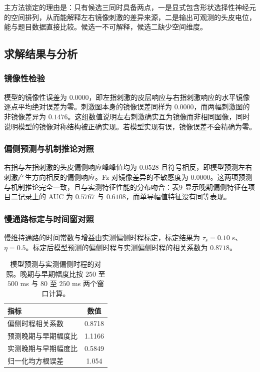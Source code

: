 \documentclass[bwprint]{gmcmthesis}
\begin{document}
主方法锁定的理由是：只有候选三同时具备两点，一是显式包含形状选择性神经元的空间排列，从而能解释左右镜像刺激的差异来源，二是输出可观测的头皮电位，能与题目数据直接比较。候选一不可解释，候选二缺少空间维度。

\subsection{求解结果与分析}

\subsubsection{镜像性检验}

模型的镜像性误差为 $0.0000$，即左指刺激的皮层响应与右指刺激响应的水平镜像逐点平均绝对误差为零。刺激图本身的镜像误差同样为 $0.0000$，而两幅刺激图的非镜像差异为 $0.1476$。这组数值说明左右刺激确实互为镜像而非相同图像，同时说明模型的镜像对称结构被正确实现。若模型实现有误，镜像误差不会精确为零。

\subsubsection{偏侧预测与机制推论对照}

右指与左指刺激的头皮偏侧响应峰峰值均为 $0.0528$ 且符号相反，即模型预测左右刺激产生方向相反的偏侧响应。Fz 对镜像差异的不敏感度为 $0.0000$。这两项预测与机制推论完全一致，且与实测特征性能的分布吻合：表9 显示晚期偏侧特征在项目二记录上的 AUC 为 $0.5767$ 与 $0.6108$，而单导幅值特征没有同等表现。

\subsubsection{慢通路标定与时间窗对照}

慢维持通路的时间常数与增益由实测偏侧时程标定，标定结果为 $\tau_s = 0.10$ s、$\eta = 0.5$。标定后模型预测的偏侧时程与实测偏侧时程的相关系数为 $0.8718$。

\begin{table}[htp!]
\centering
\renewcommand\arraystretch{1.2}
\caption{模型预测与实测偏侧时程的对照。晚期与早期幅度比按 $250$ 至 $500$ ms 与 $80$ 至 $250$ ms 两个窗口计算。}
\begin{tabular}{|l|c|}
  \hline
  指标 & 数值 \\
  \hline
  偏侧时程相关系数 & 0.8718 \\
  \hline
  预测晚期与早期幅度比 & 1.1166 \\
  \hline
  实测晚期与早期幅度比 & 0.5849 \\
  \hline
  归一化均方根误差 & 1.054 \\
  \hline
\end{tabular}
\end{table}
\end{document}
